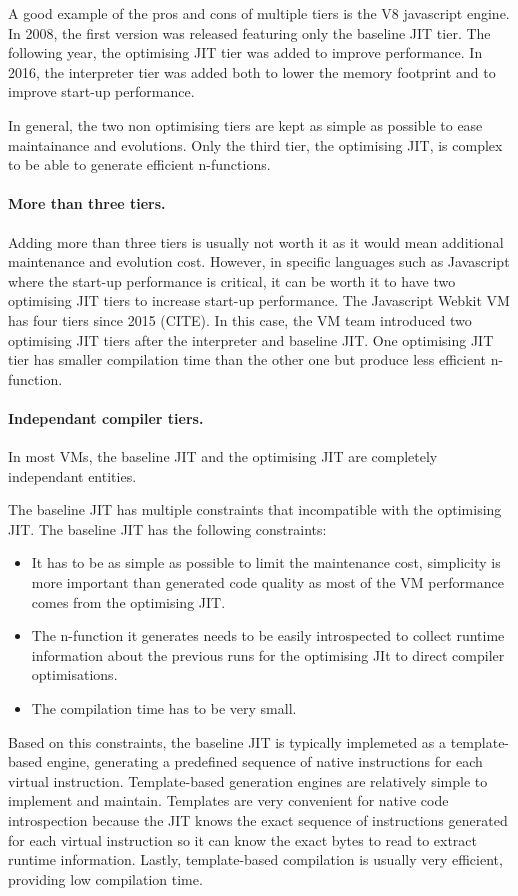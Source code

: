 \documentclass[a4paper,12pt,twoside]{../includes/ThesisStyle}
\begin{document}
A good example of the pros and cons of multiple tiers is the V8 javascript engine. In 2008, the first version was released featuring only the baseline JIT tier. The following year, the optimising JIT tier was added to improve performance. In 2016, the interpreter tier was added both to lower the memory footprint and to improve start-up performance.

In general, the two non optimising tiers are kept as simple as possible to ease maintainance and evolutions. Only the third tier, the optimising JIT, is complex to be able to generate efficient n-functions.

\paragraph{More than three tiers.} Adding more than three tiers is usually not worth it as it would mean additional maintenance and evolution cost. However, in specific languages such as Javascript where the start-up performance is critical, it can be worth it to have two optimising JIT tiers to increase start-up performance. The Javascript Webkit VM has four tiers since 2015 (CITE). In this case, the VM team introduced two optimising JIT tiers after the interpreter and baseline JIT. One optimising JIT tier has smaller compilation time than the other one but produce less efficient n-function.

\paragraph{Independant compiler tiers.}
In most VMs, the baseline JIT and the optimising JIT are completely independant entities.

The baseline JIT has multiple constraints that incompatible with the optimising JIT. The baseline JIT has the following constraints:
\begin{itemize}
	\item It has to be as simple as possible to limit the maintenance cost, simplicity is more important than generated code quality as most of the VM performance comes from the optimising JIT.
	\item The n-function it generates needs to be easily introspected to collect runtime information about the previous runs for the optimising JIt to direct compiler optimisations.
	\item The compilation time has to be very small.
\end{itemize}
Based on this constraints, the baseline JIT is typically implemeted as a template-based engine, generating a predefined sequence of native instructions for each virtual instruction. Template-based generation engines are relatively simple to implement and maintain. Templates are very convenient for native code introspection because the JIT knows the exact sequence of instructions generated for each virtual instruction so it can know the exact bytes to read to extract runtime information. Lastly, template-based compilation is usually very efficient, providing low compilation time.
\end{document}
